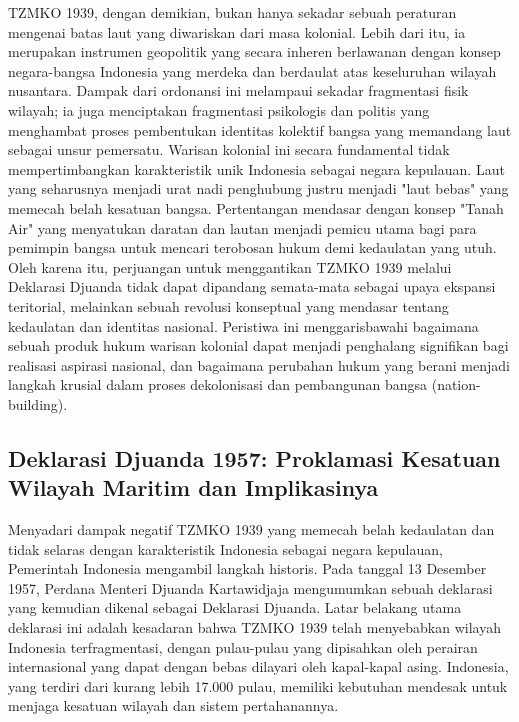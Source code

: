 \documentclass[12pt, a4paper]{article}
\begin{document}
TZMKO 1939, dengan demikian, bukan hanya sekadar sebuah peraturan mengenai batas laut yang diwariskan dari masa kolonial. Lebih dari itu, ia merupakan instrumen geopolitik yang secara inheren berlawanan dengan konsep negara-bangsa Indonesia yang merdeka dan berdaulat atas keseluruhan wilayah nusantara. Dampak dari ordonansi ini melampaui sekadar fragmentasi fisik wilayah; ia juga menciptakan fragmentasi psikologis dan politis yang menghambat proses pembentukan identitas kolektif bangsa yang memandang laut sebagai unsur pemersatu. Warisan kolonial ini secara fundamental tidak mempertimbangkan karakteristik unik Indonesia sebagai negara kepulauan. Laut yang seharusnya menjadi urat nadi penghubung justru menjadi "laut bebas" yang memecah belah kesatuan bangsa. Pertentangan mendasar dengan konsep "Tanah Air" yang menyatukan daratan dan lautan  menjadi pemicu utama bagi para pemimpin bangsa untuk mencari terobosan hukum demi kedaulatan yang utuh. Oleh karena itu, perjuangan untuk menggantikan TZMKO 1939 melalui Deklarasi Djuanda tidak dapat dipandang semata-mata sebagai upaya ekspansi teritorial, melainkan sebuah revolusi konseptual yang mendasar tentang kedaulatan dan identitas nasional. Peristiwa ini menggarisbawahi bagaimana sebuah produk hukum warisan kolonial dapat menjadi penghalang signifikan bagi realisasi aspirasi nasional, dan bagaimana perubahan hukum yang berani menjadi langkah krusial dalam proses dekolonisasi dan pembangunan bangsa (nation-building).  

\subsection*{Deklarasi Djuanda 1957: Proklamasi Kesatuan Wilayah Maritim dan Implikasinya}

Menyadari dampak negatif TZMKO 1939 yang memecah belah kedaulatan dan tidak selaras dengan karakteristik Indonesia sebagai negara kepulauan, Pemerintah Indonesia mengambil langkah historis. Pada tanggal 13 Desember 1957, Perdana Menteri Djuanda Kartawidjaja mengumumkan sebuah deklarasi yang kemudian dikenal sebagai Deklarasi Djuanda. Latar belakang utama deklarasi ini adalah kesadaran bahwa TZMKO 1939 telah menyebabkan wilayah Indonesia terfragmentasi, dengan pulau-pulau yang dipisahkan oleh perairan internasional yang dapat dengan bebas dilayari oleh kapal-kapal asing. Indonesia, yang terdiri dari kurang lebih 17.000 pulau, memiliki kebutuhan mendesak untuk menjaga kesatuan wilayah dan sistem pertahanannya.  
\end{document}
